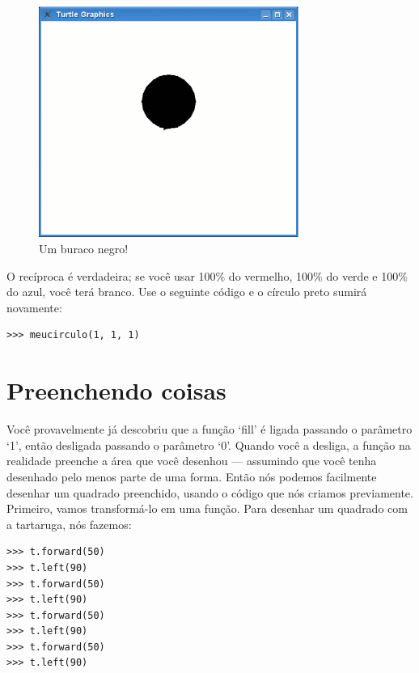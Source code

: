 \begin{figure}
\begin{center}
\includegraphics[width=85mm]{eps/figure25.eps}
\end{center}
\caption{Um buraco negro!}\label{fig25}
\end{figure}

O recíproca é verdadeira; se você usar 100\% do vermelho, 100\% do verde e 100\% do azul, você terá branco. Use o seguinte código e o círculo preto sumirá novamente:

\begin{listing}
\begin{verbatim}
>>> meucirculo(1, 1, 1)
\end{verbatim}
\end{listing}

\section{Preenchendo coisas}

Você provavelmente já descobriu que a função `fill' é ligada passando o parâmetro `1', então desligada passando o parâmetro `0'. Quando você a desliga, a função na realidade preenche a área que você desenhou --- assumindo que você tenha desenhado pelo menos parte de uma forma. Então nós podemos facilmente desenhar um quadrado preenchido, usando o código que nós criamos previamente. Primeiro, vamos transformá-lo em uma função. Para desenhar um quadrado com a tartaruga, nós fazemos:

\begin{listing}
\begin{verbatim}
>>> t.forward(50)
>>> t.left(90)
>>> t.forward(50)
>>> t.left(90)
>>> t.forward(50)
>>> t.left(90)
>>> t.forward(50)
>>> t.left(90)
\end{verbatim}
\end{listing}

